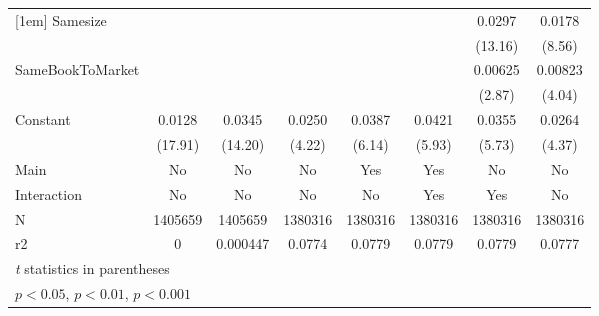 {\begin{tabular}{l*{7}{c}}
[1em]
Samesize            &                     &                     &                     &                     &                     &      0.0297\sym{***}&      0.0178\sym{***}\\
                    &                     &                     &                     &                     &                     &     (13.16)         &      (8.56)         \\
[1em]
SameBookToMarket    &                     &                     &                     &                     &                     &     0.00625\sym{**} &     0.00823\sym{***}\\
                    &                     &                     &                     &                     &                     &      (2.87)         &      (4.04)         \\
[1em]
Constant            &      0.0128\sym{***}&      0.0345\sym{***}&      0.0250\sym{***}&      0.0387\sym{***}&      0.0421\sym{***}&      0.0355\sym{***}&      0.0264\sym{***}\\
                    &     (17.91)         &     (14.20)         &      (4.22)         &      (6.14)         &      (5.93)         &      (5.73)         &      (4.37)         \\
\hline
Main                &          No         &          No         &          No         &         Yes         &         Yes         &          No         &          No         \\
Interaction         &          No         &          No         &          No         &          No         &         Yes         &         Yes         &          No         \\
N                   &     1405659         &     1405659         &     1380316         &     1380316         &     1380316         &     1380316         &     1380316         \\
r2                  &           0         &    0.000447         &      0.0774         &      0.0779         &      0.0779         &      0.0779         &      0.0777         \\
\hline\hline
\multicolumn{8}{l}{\footnotesize \textit{t} statistics in parentheses}\\
\multicolumn{8}{l}{\footnotesize \sym{*} \(p<0.05\), \sym{**} \(p<0.01\), \sym{***} \(p<0.001\)}\\
\end{tabular}
}
